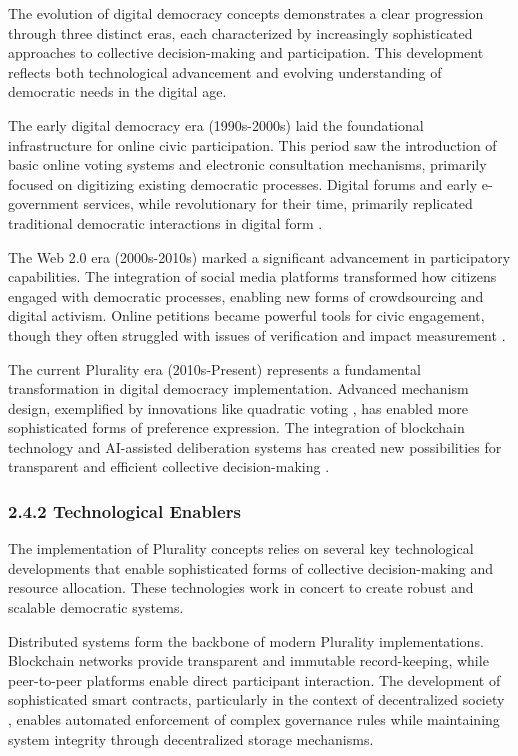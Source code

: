 The evolution of digital democracy concepts demonstrates a clear progression through three distinct eras, each characterized by increasingly sophisticated approaches to collective decision-making and participation. This development reflects both technological advancement and evolving understanding of democratic needs in the digital age.

The early digital democracy era (1990s-2000s) laid the foundational infrastructure for online civic participation. This period saw the introduction of basic online voting systems and electronic consultation mechanisms, primarily focused on digitizing existing democratic processes. Digital forums and early e-government services, while revolutionary for their time, primarily replicated traditional democratic interactions in digital form \citep{polis2024}.

The Web 2.0 era (2000s-2010s) marked a significant advancement in participatory capabilities. The integration of social media platforms transformed how citizens engaged with democratic processes, enabling new forms of crowdsourcing and digital activism. Online petitions became powerful tools for civic engagement, though they often struggled with issues of verification and impact measurement \citep{vtaiwan2023}.

The current Plurality era (2010s-Present) represents a fundamental transformation in digital democracy implementation. Advanced mechanism design, exemplified by innovations like quadratic voting \citep{buterin2019flexible}, has enabled more sophisticated forms of preference expression. The integration of blockchain technology and AI-assisted deliberation systems has created new possibilities for transparent and efficient collective decision-making \citep{weyl2022decentralized}.

\hypertarget{technological-enablers}{%
\subsubsection{2.4.2 Technological Enablers}\label{technological-enablers}}

The implementation of Plurality concepts relies on several key technological developments that enable sophisticated forms of collective decision-making and resource allocation. These technologies work in concert to create robust and scalable democratic systems.

Distributed systems form the backbone of modern Plurality implementations. Blockchain networks provide transparent and immutable record-keeping, while peer-to-peer platforms enable direct participant interaction. The development of sophisticated smart contracts, particularly in the context of decentralized society \citep{weyl2022decentralized}, enables automated enforcement of complex governance rules while maintaining system integrity through decentralized storage mechanisms.

